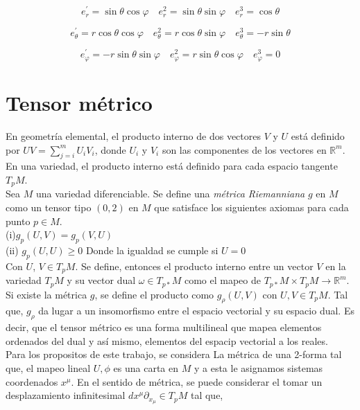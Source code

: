 \documentclass{report}
\begin{document}
{\[e_{r}^{\prime} = \sin \theta \cos \varphi \quad e_{r}^{2} = \sin \theta \sin \varphi \quad e_{r}^{3} = \cos \theta\]

\[e_{\theta}^{\prime} =  r \cos \theta \cos \varphi \quad e_{\theta} ^{2}=  r \cos \theta \sin \varphi \quad e^{3}_{\theta} = - r \sin \theta \]

\[e_{\varphi}^{\prime}= -r \sin \theta \sin\varphi \quad e_{\varphi}^{2}=r\sin\theta \cos \varphi \quad e^{3}_{\varphi } = 0 \]

\section{Tensor métrico}


En geometría elemental, el producto interno de dos vectores $V$ y $U$ está definido por $UV = \sum _{j = i} ^{m} U_{i}V_{i}$, donde $U_{i}$ y $V_{i}$ son las componentes de los vectores en $\mathbb{R}^{m}$. En una variedad, el producto interno está definido para cada espacio tangente $T_{p}M$.\\


Sea $M$ una variedad diferenciable. Se define una \textit{métrica Riemanniana} $g$ en $M$ como un tensor tipo $(0,2)$ en $M$ que satisface los siguientes axiomas para cada punto $p \in M$.\\

(i)$g_{p} (U,V) = g_{p}(V,U)$\\
(ii) $g_{p}(U,U) \geq 0$ Donde la igualdad se cumple si $U = 0$\\

Con $U$, $V \in T_{p}M$. Se define, entonces el producto interno entre un vector $V$ en la variedad $T_{p}M$ y su vector dual $\omega \in T_{p*}M$ como el mapeo de $T_{p*}M \times T_{p}M\rightarrow \mathbb{R}^{m}$. Si existe la métrica $g$, se define el producto como $g_{\rho}(U,V)$ con $U,V \in T_{p}M$. Tal que, $g_{\rho}$ da lugar a un insomorfismo entre el espacio vectorial y su espacio dual. Es decir, que el tensor métrico es una forma multilineal que mapea elementos ordenados del dual y así mismo, elementos del espacip vectorial a los reales.\\

Para los propositos de este trabajo, se considera La métrica de una 2-forma  tal que, el mapeo lineal $U,\phi$ es una carta en $M$ y a esta le asignamos sistemas coordenados $x ^{\mu}$. En el sentido de métrica, se puede considerar el tomar un desplazamiento infinitesimal $dx^{\mu} \partial_{x_{\mu }} \in T_{p}M $ tal que,

}
\end{document}
